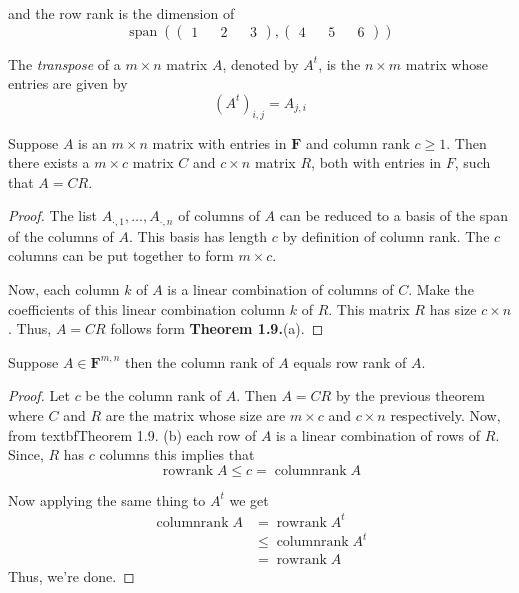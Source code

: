 and the row rank is the dimension of
\[ \operatorname{span} \left(  \begin{pmatrix}
    1 && 2 && 3
\end{pmatrix} , \begin{pmatrix}
    4 && 5 && 6
\end{pmatrix}\right) \]

\begin{definition}
    The \textit{transpose} of a $m \times n$ matrix $A$, denoted by $A^t$, is the $n \times m$ matrix whose entries are given by
    \[ (A^t)_{i,j} = A_{j,i} \] 
\end{definition}

\begin{theorem}
    Suppose $A$ is an $m \times n$ matrix with entries in $\mathbf{F}$ and column rank $c \ge 1$. Then there exists a $m \times c$ matrix
    $C$ and $c \times n$ matrix $R$, both with entries in $F$, such that $A=CR$. 
\end{theorem}

\begin{proof}
    The list $A_{\cdot, 1}, \ldots, A_{\cdot, n}$ of columns of $A$ can be reduced to a basis of the span of the columns of $A$. This basis
    has length $c$ by definition of column rank. The $c$ columns can be put together to form $m \times c$.
    
    Now, each column $k$ of $A$ is a linear combination of columns of $C$. Make the coefficients of this linear combination column $k$ of 
    $R$. This matrix $R$ has size $c \times n$. Thus, $A = CR$ follows form \textbf{Theorem 1.9.}(a).
\end{proof}

\begin{theorem}
    Suppose $A \in \mathbf{F}^{m,n}$ then the column rank of $A$ equals row rank of $A$.
\end{theorem}

\begin{proof}
    Let $c$ be the column rank of $A$. Then $A=CR$ by the previous theorem where $C$ and $R$ are the matrix whose size are $m \times c$ and 
    $c \times n$ respectively. Now, from textbf{Theorem 1.9.} (b) each row of $A$ is a linear combination of rows of $R$. Since, $R$ has 
    $c$ columns this implies that 
    \[  \operatorname{row rank} A \le c = \operatorname{column rank} A \] 

    Now applying the same thing to $A^t$ we get
    \begin{align*}
        \operatorname{column rank } A &= \operatorname{row rank } A^t \\
        &\le \operatorname{column rank} A^t \\ 
        &= \operatorname{row rank} A 
    \end{align*}
    Thus, we're done.
\end{proof}

